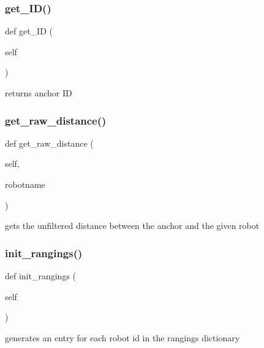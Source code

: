 \subsubsection{\texorpdfstring{get\+\_\+\+I\+D()}{get\_ID()}}
{\footnotesize\ttfamily def get\+\_\+\+ID (\begin{DoxyParamCaption}\item[{}]{self }\end{DoxyParamCaption})}

\begin{DoxyVerb}returns anchor ID\end{DoxyVerb}
 \mbox{\label{classanchor_1_1_anchor_aa86606ff415bcf3f0e24b2348e925496}} 
\subsubsection{\texorpdfstring{get\+\_\+raw\+\_\+distance()}{get\_raw\_distance()}}
{\footnotesize\ttfamily def get\+\_\+raw\+\_\+distance (\begin{DoxyParamCaption}\item[{}]{self,  }\item[{}]{robotname }\end{DoxyParamCaption})}

\begin{DoxyVerb}gets the unfiltered distance between the anchor and the given robot\end{DoxyVerb}
 \mbox{\label{classanchor_1_1_anchor_acb50ac316e2abe4093f8e842635467ab}} 
\subsubsection{\texorpdfstring{init\+\_\+rangings()}{init\_rangings()}}
{\footnotesize\ttfamily def init\+\_\+rangings (\begin{DoxyParamCaption}\item[{}]{self }\end{DoxyParamCaption})}

\begin{DoxyVerb}generates an entry for each robot id in the rangings dictionary\end{DoxyVerb}
 \mbox{\label{classanchor_1_1_anchor_afc59fd77ac0d0375226e77947f7f6624}} 
